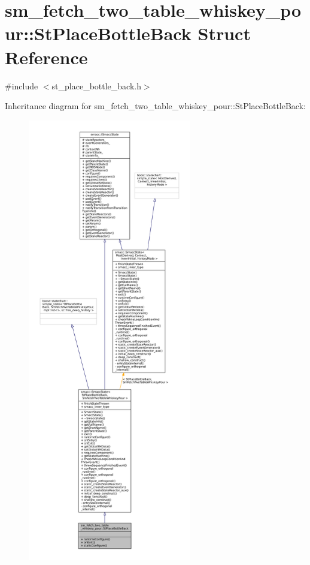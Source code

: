 \hypertarget{structsm__fetch__two__table__whiskey__pour_1_1StPlaceBottleBack}{}\section{sm\+\_\+fetch\+\_\+two\+\_\+table\+\_\+whiskey\+\_\+pour\+:\+:St\+Place\+Bottle\+Back Struct Reference}
\label{structsm__fetch__two__table__whiskey__pour_1_1StPlaceBottleBack}


{\ttfamily \#include $<$st\+\_\+place\+\_\+bottle\+\_\+back.\+h$>$}



Inheritance diagram for sm\+\_\+fetch\+\_\+two\+\_\+table\+\_\+whiskey\+\_\+pour\+:\+:St\+Place\+Bottle\+Back\+:
\nopagebreak
\begin{figure}[H]
\begin{center}
\leavevmode
\includegraphics[height=550pt]{structsm__fetch__two__table__whiskey__pour_1_1StPlaceBottleBack__inherit__graph}
\end{center}
\end{figure}


